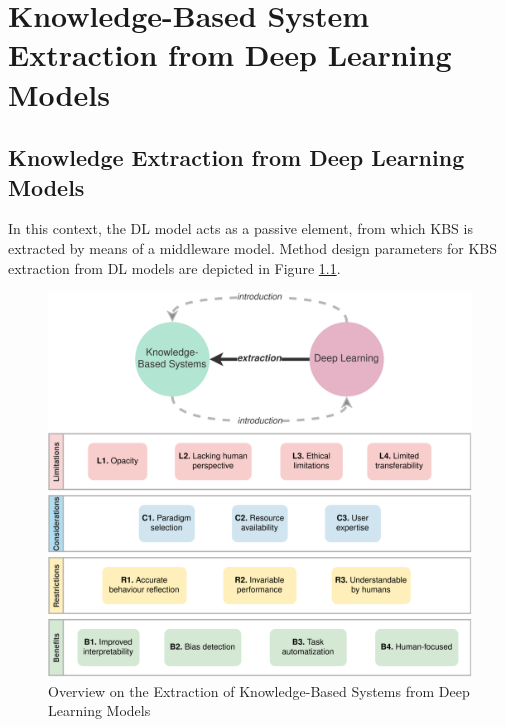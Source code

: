 \chapter{Knowledge-Based System Extraction from Deep Learning Models}
\label{chap:kbsextractiondl}
\section{Knowledge Extraction from Deep Learning Models}
In this context, the DL model acts as a passive element, from which KBS is extracted by means of a middleware model. Method design parameters for KBS extraction from DL models are depicted in Figure \ref{fig:kbs_extra_dl_overview}.
\begin{figure}[t]
    \centering
    \includegraphics[width=\linewidth]{6_kbsextractiondl/figures/K_extraction_DL.eps}
    \caption{Overview on the Extraction of Knowledge-Based Systems from Deep Learning Models}
    \label{fig:kbs_extra_dl_overview}
\end{figure}


